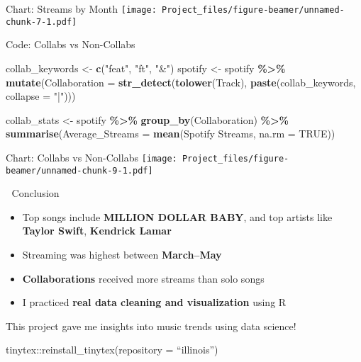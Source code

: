 \documentclass[
  ignorenonframetext,
]{beamer}
\newenvironment{Shaded}{\begin{snugshade}}{\end{snugshade}}
\newcommand{\AttributeTok}[1]{\textcolor[rgb]{0.13,0.29,0.53}{#1}}
\newcommand{\ConstantTok}[1]{\textcolor[rgb]{0.56,0.35,0.01}{#1}}
\newcommand{\FunctionTok}[1]{\textcolor[rgb]{0.13,0.29,0.53}{\textbf{#1}}}
\newcommand{\NormalTok}[1]{#1}
\newcommand{\OtherTok}[1]{\textcolor[rgb]{0.56,0.35,0.01}{#1}}
\newcommand{\SpecialCharTok}[1]{\textcolor[rgb]{0.81,0.36,0.00}{\textbf{#1}}}
\newcommand{\StringTok}[1]{\textcolor[rgb]{0.31,0.60,0.02}{#1}}
\providecommand{\tightlist}{%
  \setlength{\itemsep}{0pt}\setlength{\parskip}{0pt}}
\begin{document}
\begin{frame}{Chart: Streams by Month}
\label{chart-streams-by-month}
\texttt{[image: Project\_files/figure-beamer/unnamed-chunk-7-1.pdf]}
\end{frame}

\begin{frame}[fragile]{Code: Collabs vs Non-Collabs}
\label{code-collabs-vs-non-collabs}
\begin{Shaded}
\begin{Highlighting}[]
\NormalTok{collab\_keywords }\OtherTok{\textless{}{-}} \FunctionTok{c}\NormalTok{(}\StringTok{"feat"}\NormalTok{, }\StringTok{"ft"}\NormalTok{, }\StringTok{"\&"}\NormalTok{)}
\NormalTok{spotify }\OtherTok{\textless{}{-}}\NormalTok{ spotify }\SpecialCharTok{\%\textgreater{}\%}
  \FunctionTok{mutate}\NormalTok{(}\AttributeTok{Collaboration =} \FunctionTok{str\_detect}\NormalTok{(}\FunctionTok{tolower}\NormalTok{(Track), }\FunctionTok{paste}\NormalTok{(collab\_keywords, }\AttributeTok{collapse =} \StringTok{"|"}\NormalTok{)))}

\NormalTok{collab\_stats }\OtherTok{\textless{}{-}}\NormalTok{ spotify }\SpecialCharTok{\%\textgreater{}\%}
  \FunctionTok{group\_by}\NormalTok{(Collaboration) }\SpecialCharTok{\%\textgreater{}\%}
  \FunctionTok{summarise}\NormalTok{(}\AttributeTok{Average\_Streams =} \FunctionTok{mean}\NormalTok{(}\StringTok{\textasciigrave{}}\AttributeTok{Spotify Streams}\StringTok{\textasciigrave{}}\NormalTok{, }\AttributeTok{na.rm =} \ConstantTok{TRUE}\NormalTok{))}
\end{Highlighting}
\end{Shaded}
\end{frame}

\begin{frame}{Chart: Collabs vs Non-Collabs}
\label{chart-collabs-vs-non-collabs}
\texttt{[image: Project\_files/figure-beamer/unnamed-chunk-9-1.pdf]}
\end{frame}

\begin{frame}{📌 Conclusion}
\label{conclusion}
\begin{itemize}
\tightlist
\item
  Top songs include \textbf{MILLION DOLLAR BABY}, and top artists like
  \textbf{Taylor Swift}, \textbf{Kendrick Lamar}\\
\item
  Streaming was highest between \textbf{March--May}\\
\item
  \textbf{Collaborations} received more streams than solo songs\\
\item
  I practiced \textbf{real data cleaning and visualization} using R
\end{itemize}

This project gave me insights into music trends using data science!

tinytex::reinstall\_tinytex(repository = ``illinois'')
\end{frame}
\end{document}
